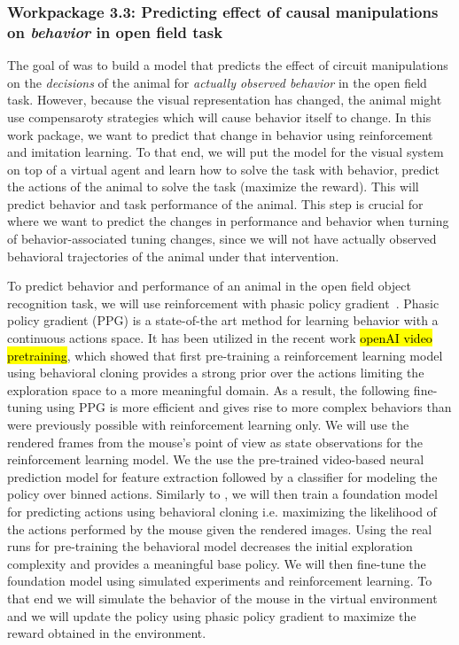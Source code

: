 \documentclass[B2,COG]{ercgrant}
\begin{document}
\subsubsection{Workpackage 3.3: Predicting effect of causal manipulations on \textit{behavior} in open field task\hfill{}}
The goal of  was to build a model that predicts the effect of circuit manipulations on the \textit{decisions} of the animal for \textit{actually observed behavior} in the open field task. 
However, because the visual representation has changed, the animal might use compensaroty strategies which will cause behavior itself to change. 
In this work package, we want to predict that change in behavior using reinforcement and imitation learning. 
To that end, we will put the model for the visual system on top of a virtual agent and learn how to solve the task with behavior, \ie predict the actions of the animal to solve the task (maximize the reward). 
This will predict behavior and task performance of the animal. 
This step is crucial for  where we want to predict the changes in performance and behavior when turning of behavior-associated tuning changes, since we will not have actually observed behavioral trajectories of the animal under that intervention. 

To predict behavior and performance of an animal in the open field object recognition task, we will use reinforcement with phasic policy gradient~\parencite[PPG,][]{Cobbe2021-op}. 
Phasic policy gradient (PPG) is a state-of-the art method for learning behavior with a continuous actions space. 
It has been utilized in the recent work \hl{openAI video pretraining}, which showed that first pre-training a reinforcement learning model using behavioral cloning provides a strong prior over the actions limiting the exploration space to a more meaningful domain. 
As a result, the following fine-tuning using PPG is more efficient and gives rise to more complex behaviors than were previously possible with reinforcement learning only.
We will use the rendered frames from the mouse's point of view as state observations for the reinforcement learning model. 
We the use the pre-trained video-based neural prediction model for feature extraction followed by a classifier for modeling the policy over binned actions.
Similarly to \cite{Baker2022-ph}, we will then train a foundation model for predicting actions using behavioral cloning i.e. maximizing the likelihood of the actions performed by the mouse given the rendered images.
Using the real runs for pre-training the behavioral model decreases the initial exploration complexity and provides a meaningful base policy.
We will then fine-tune the foundation model using simulated experiments and reinforcement learning. 
To that end we will simulate the behavior of the mouse in the virtual environment and we will update the policy using phasic policy gradient \parencite{Cobbe2021-op} to maximize the reward obtained in the environment.
\end{document}
